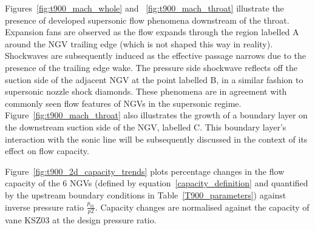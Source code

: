 \documentclass[a4paper, 11pt, oneside]{report}
\begin{document}
Figures~\ref{fig:t900_mach_whole} and ~\ref{fig:t900_mach_throat} illustrate the presence of developed supersonic flow phenomena downstream of the throat. Expansion fans are observed as the flow expands through the region labelled A around the NGV trailing edge (which is not shaped this way in reality). Shockwaves are subsequently induced as the effective passage narrows due to the presence of the trailing edge wake. The pressure side shockwave reflects off the suction side of the adjacent NGV at the point labelled B, in a similar fashion to supersonic nozzle shock diamonds. These phenomena are in agreement with commonly seen flow features of NGVs in the supersonic regime. Figure~\ref{fig:t900_mach_throat} also illustrates the growth of a boundary layer on the downstream suction side of the NGV, labelled C. This boundary layer's interaction with the sonic line will be subsequently discussed in the context of its effect on flow capacity.

Figure~\ref{fig:t900_2d_capacity_trends} plots percentage changes in the flow capacity of the 6 NGVs (defined by equation~\ref{capacity_definition} and quantified by the upstream boundary conditions in Table~\ref{T900_parameters}) against inverse pressure ratio $\frac{p_{01}}{p2}$. Capacity changes are normalised against the capacity of vane KSZ03 at the design pressure ratio.
\end{document}
